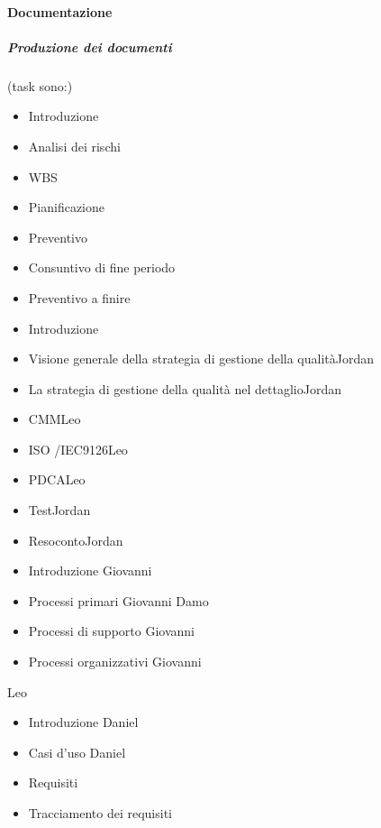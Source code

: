 			\paragraph {Documentazione}
				\subparagraph{Produzione dei documenti}
					 (task sono:)
						\begin{itemize}
						\item{Introduzione}
						\item{Analisi dei rischi}
						\item{WBS}
						\item{Pianificazione}
						\item{Preventivo}
						\item{Consuntivo di fine periodo}
						\item{Preventivo a finire}
						\end{itemize}
						\begin{itemize}
						\item{Introduzione} 
						\item{Visione generale della strategia di gestione della qualità}Jordan
						\item{La strategia di gestione della qualità nel dettaglio}Jordan
						\item{CMM}Leo
						\item{ISO /IEC9126}Leo
						\item{PDCA}Leo
						\item{Test}Jordan
						\item{Resoconto}Jordan
						\end{itemize}
						\begin{itemize}
						\item{Introduzione} Giovanni
						\item{Processi primari} Giovanni Damo
						\item{Processi di supporto} Giovanni
						\item{Processi organizzativi} Giovanni
						\end{itemize}
					 Leo
						\begin{itemize}
						\item{Introduzione} Daniel
						\item{Casi d'uso} Daniel
						\item{Requisiti} 
						\item{Tracciamento dei requisiti} 
						\end{itemize}
